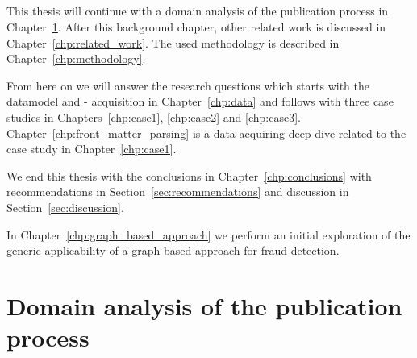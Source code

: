 \documentclass{ou-report}
\newcommand{\outline}[1]{{\color{blue} #1}}
\begin{document}
    

\paragraph{}
This thesis will continue with a domain analysis of the publication process in
Chapter~\ref{chp:domainanalysis}. After this background chapter, other 
related work is discussed in Chapter~\ref{chp:related_work}. The used
methodology is described in Chapter~\ref{chp:methodology}. 

From here on we will
answer the research questions which starts with the datamodel and - acquisition
in Chapter~\ref{chp:data} and follows with three case studies in 
Chapters~\ref{chp:case1}, \ref{chp:case2} and \ref{chp:case3}. 
Chapter~\ref{chp:front_matter_parsing} is a data acquiring deep dive related to
the case study in Chapter~\ref{chp:case1}.

We end this thesis with the conclusions in Chapter~\ref{chp:conclusions} with
recommendations in Section~\ref{sec:recommendations} and discussion in
Section~\ref{sec:discussion}.

In Chapter~\ref{chp:graph_based_approach} we perform an initial exploration of 
the generic applicability of a graph based approach for fraud detection.



\chapter{Domain analysis of the publication process}
\label{chp:domainanalysis}
\end{document}

